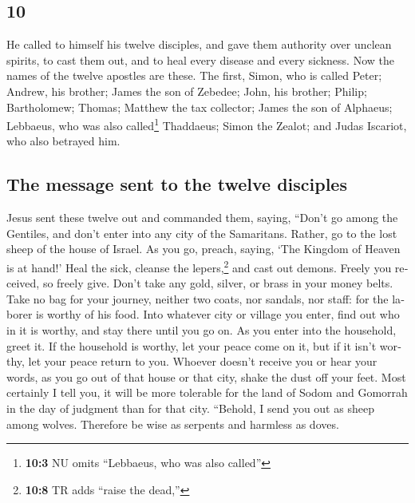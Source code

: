 \begin{paracol}{2}
\begin{otherlanguage}{english}
\hypertarget{section-19}{%
\section{10}\label{section-19}}

 He called to himself his twelve disciples, and gave them
authority over unclean spirits, to cast them out, and to heal every
disease and every sickness.  Now the names of the twelve
apostles are these. The first, Simon, who is called Peter; Andrew, his
brother; James the son of Zebedee; John, his brother; 
Philip; Bartholomew; Thomas; Matthew the tax collector; James the son of
Alphaeus; Lebbaeus, who was also called\footnote{\textbf{10:3} NU omits
  ``Lebbaeus, who was also called''} Thaddaeus;  Simon the
Zealot; and Judas Iscariot, who also betrayed him.

\hypertarget{the-message-sent-to-the-twelve-disciples}{%
\subsection{The message sent to the twelve
disciples}\label{the-message-sent-to-the-twelve-disciples}}

 Jesus sent these twelve out and commanded them, saying,
``Don't go among the Gentiles, and don't enter into any city of the
Samaritans.  Rather, go to the lost sheep of the house of
Israel.  As you go, preach, saying, `The Kingdom of Heaven
is at hand!'  Heal the sick, cleanse the
lepers,\footnote{\textbf{10:8} TR adds ``raise the dead,''} and cast out
demons. Freely you received, so freely give.  Don't take
any gold, silver, or brass in your money belts.  Take no
bag for your journey, neither two coats, nor sandals, nor staff: for the
laborer is worthy of his food.  Into whatever city or
village you enter, find out who in it is worthy, and stay there until
you go on.  As you enter into the household, greet it.
 If the household is worthy, let your peace come on it,
but if it isn't worthy, let your peace return to you. 
Whoever doesn't receive you or hear your words, as you go out of that
house or that city, shake the dust off your feet.  Most
certainly I tell you, it will be more tolerable for the land of Sodom
and Gomorrah in the day of judgment than for that city. 
``Behold, I send you out as sheep among wolves. Therefore be wise as
serpents and harmless as doves.


\end{otherlanguage}
\end{paracol}
